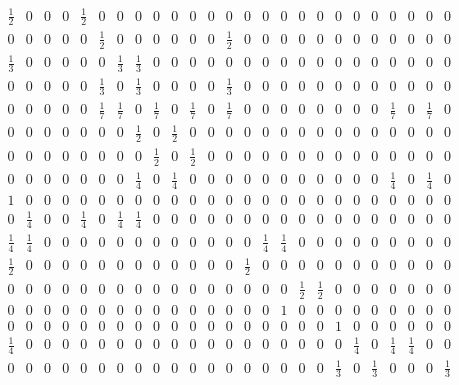 \documentclass[11pt]{report}
\begin{document}
{\begin{appendices}
\begin{figure} [h!]
\begin{equation*}
\begin{array}{ccccccccccccccccccccccccc}
\frac{1}{2}&0&0&0&\frac{1}{2}&0&0&0&0&0&0&0&0&0&0&0&0&0&0&0&0&0&0&0&0\\

0&0&0&0&0&\frac{1}{2}&0&0&0&0&0&0&\frac{1}{2}&0&0&0&0&0&0&0&0&0&0&0&0\\

\frac{1}{3}&0&0&0&0&0&\frac{1}{3}&\frac{1}{3}&0&0&0&0&0&0&0&0&0&0&0&0&0&0&0&0&0\\

0&0&0&0&0&\frac{1}{3}&0&\frac{1}{3}&0&0&0&0&\frac{1}{3}&0&0&0&0&0&0&0&0&0&0&0&0\\

0&0&0&0&0&\frac{1}{7}&\frac{1}{7}&0&\frac{1}{7}&0&\frac{1}{7}&0&\frac{1}{7}&0&0&0&0&0&0&0&0&\frac{1}{7}&0&\frac{1}{7}&0\\

0&0&0&0&0&0&0&\frac{1}{2}&0&\frac{1}{2}&0&0&0&0&0&0&0&0&0&0&0&0&0&0&0\\

0&0&0&0&0&0&0&0&\frac{1}{2}&0&\frac{1}{2}&0&0&0&0&0&0&0&0&0&0&0&0&0&0\\

0&0&0&0&0&0&0&\frac{1}{4}&0&\frac{1}{4}&0&0&0&0&0&0&0&0&0&0&0&\frac{1}{4}&0&\frac{1}{4}&0\\

1&0&0&0&0&0&0&0&0&0&0&0&0&0&0&0&0&0&0&0&0&0&0&0&0\\

0&\frac{1}{4}&0&0&\frac{1}{4}&0&\frac{1}{4}&\frac{1}{4}&0&0&0&0&0&0&0&0&0&0&0&0&0&0&0&0&0\\

\frac{1}{4}&\frac{1}{4}&0&0&0&0&0&0&0&0&0&0&0&0&\frac{1}{4}&\frac{1}{4}&0&0&0&0&0&0&0&0&0\\

\frac{1}{2}&0&0&0&0&0&0&0&0&0&0&0&0&\frac{1}{2}&0&0&0&0&0&0&0&0&0&0&0\\

0&0&0&0&0&0&0&0&0&0&0&0&0&0&0&0&\frac{1}{2}&\frac{1}{2}&0&0&0&0&0&0&0\\

0&0&0&0&0&0&0&0&0&0&0&0&0&0&0&1&0&0&0&0&0&0&0&0&0\\

0&0&0&0&0&0&0&0&0&0&0&0&0&0&0&0&0&0&1&0&0&0&0&0&0\\

\frac{1}{4}&0&0&0&0&0&0&0&0&0&0&0&0&0&0&0&0&0&0&\frac{1}{4}&0&\frac{1}{4}&\frac{1}{4}&0&0\\

0&0&0&0&0&0&0&0&0&0&0&0&0&0&0&0&0&0&\frac{1}{3}&0&\frac{1}{3}&0&0&0&\frac{1}{3}\\


\end{array}
\end{equation*}
\end{figure}
\end{appendices}}
\end{document}
